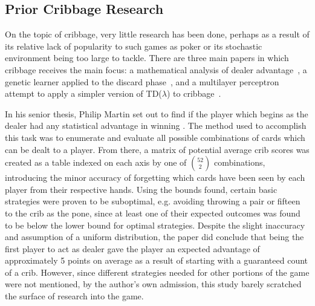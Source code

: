
\subsection{Prior Cribbage Research}


On the topic of cribbage, very little research has been done,
perhaps as a result of its relative lack of popularity to such games as poker
or its stochastic environment being too large to tackle.
%
There are three main papers in which cribbage receives the main focus:
a mathematical analysis of dealer advantage~\cite{cribbage_optimal_ev},
a genetic learner applied to the discard phase~\cite{adaptive_cribbage},
and a multilayer perceptron attempt to apply a simpler version of TD($\lambda$)
to cribbage~\cite{roconnor_cs486}.

In his senior thesis,
Philip Martin set out to find if the player which begins as the dealer
had any statistical advantage in winning
\cite{cribbage_optimal_ev}.
%
The method used to accomplish this task was to enumerate and evaluate all
possible combinations of cards which can be dealt to a player.
%
From there,
a matrix of potential average crib scores was created as a table indexed on each
axis by one of ${52 \choose 2}$ combinations,
introducing the minor accuracy of forgetting which cards have been seen by each
player from their respective hands.
%
Using the bounds found,
certain basic strategies were proven to be suboptimal,
e.g. avoiding throwing a pair or fifteen to the crib as the pone,
since at least one of their expected outcomes
was found to be below the lower bound for optimal strategies.
%
Despite the slight inaccuracy and assumption of a uniform distribution,
the paper did conclude that being the first player to act as dealer gave the
player an expected advantage of approximately 5 points on average
as a result of starting with a guaranteed count of a crib.
%
However,
since different strategies needed for other portions of the game were not
mentioned,
by the author's own admission, this study barely scratched the surface of
research into the game.

